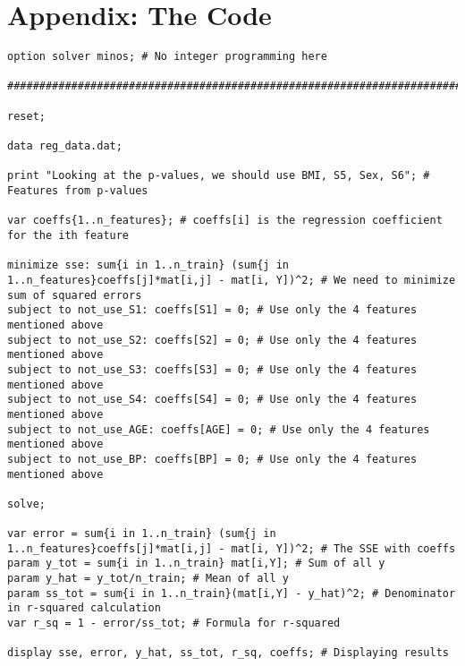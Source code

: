 \documentclass[15pt,a4paper,openright]{article}
\begin{document}
\section{Appendix: The Code}

\begin{lstlisting}[language=AMPL, caption=1a Code]
option solver minos; # No integer programming here

#########################################################################

reset;

data reg_data.dat;

print "Looking at the p-values, we should use BMI, S5, Sex, S6"; # Features from p-values

var coeffs{1..n_features}; # coeffs[i] is the regression coefficient for the ith feature

minimize sse: sum{i in 1..n_train} (sum{j in 1..n_features}coeffs[j]*mat[i,j] - mat[i, Y])^2; # We need to minimize sum of squared errors
subject to not_use_S1: coeffs[S1] = 0; # Use only the 4 features mentioned above
subject to not_use_S2: coeffs[S2] = 0; # Use only the 4 features mentioned above
subject to not_use_S3: coeffs[S3] = 0; # Use only the 4 features mentioned above
subject to not_use_S4: coeffs[S4] = 0; # Use only the 4 features mentioned above
subject to not_use_AGE: coeffs[AGE] = 0; # Use only the 4 features mentioned above
subject to not_use_BP: coeffs[BP] = 0; # Use only the 4 features mentioned above

solve;

var error = sum{i in 1..n_train} (sum{j in 1..n_features}coeffs[j]*mat[i,j] - mat[i, Y])^2; # The SSE with coeffs
param y_tot = sum{i in 1..n_train} mat[i,Y]; # Sum of all y
param y_hat = y_tot/n_train; # Mean of all y
param ss_tot = sum{i in 1..n_train}(mat[i,Y] - y_hat)^2; # Denominator in r-squared calculation
var r_sq = 1 - error/ss_tot; # Formula for r-squared

display sse, error, y_hat, ss_tot, r_sq, coeffs; # Displaying results

\end{lstlisting}
\end{document}
